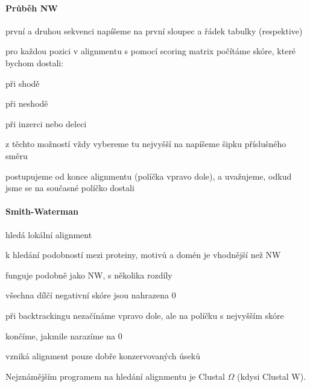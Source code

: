 \documentclass[DIV=8]{scrreprt}
\begin{document}
\paragraph{Průběh NW}
\begin{myEnumerate}[nosep]
    \item první a druhou sekvenci napíšeme na první sloupec a řádek tabulky (respektive)
    \item pro každou pozici v alignmentu s pomocí scoring matrix počítáme skóre, které bychom dostali:
\begin{myItemize}[nosep]
    \item při shodě
    \item při neshodě
    \item při inzerci nebo deleci
\end{myItemize}

    \item z těchto možností vždy vybereme tu nejvyšší na napíšeme šipku příslušného směru
    \item postupujeme od konce alignmentu (políčka vpravo dole), a uvažujeme, odkud jsme se na současné políčko dostali
\end{myEnumerate}



\paragraph{Smith-Waterman}
\begin{myItemize}[nosep]
    \item hledá lokální alignment
    \item k hledání podobností mezi proteiny, motivů a domén je vhodnější než NW
    \item funguje podobně jako NW, s několika rozdíly
\begin{myItemize}[nosep]
    \item všechna dílčí negativní skóre jsou nahrazena 0
    \item při backtrackingu nezačínáme vpravo dole, ale na políčku s nejvyšším skóre
    \item končíme, jakmile narazíme na 0
\end{myItemize}

    \item vzniká alignment pouze dobře konzervovaných úseků
\end{myItemize}



Nejznámějším programem na hledání alignmentu je Clustal \(\Omega\) (kdysi Clustal W).
\end{document}
